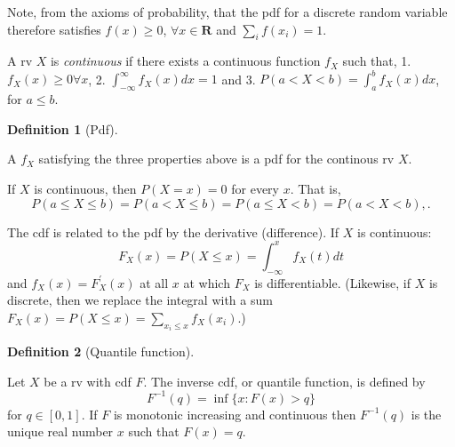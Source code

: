 \documentclass[
  a4paper,
  oneside]{book}
\theoremstyle{definition}
\newtheorem{definition}{Definition}[chapter]
\theoremstyle{definition}
\theoremstyle{definition}
\theoremstyle{plain}
\theoremstyle{remark}
\begin{document}
Note, from the axioms of probability, that the pdf for a discrete random
variable therefore satisfies \(f(x) \geq 0\),
\(\forall x \in \mathbf{R}\) and \(\sum_i f(x_i) = 1\).

A rv \(X\) is \emph{continuous} if there exists a continuous function
\(f_X\) such that, 1. \(f_X(x) \geq 0 \forall x\), 2.
\(\int_{-\infty}^\infty f_X(x) dx = 1\) and 3.
\(P(a < X < b) = \int_a^b f_X(x) dx\), for \(a\leq b\).

\begin{definition}[Pdf]\protect\hypertarget{def-pdf}{}\label{def-pdf}

A \(f_X\) satisfying the three properties above is a pdf for the
continous rv \(X\).

\end{definition}

\begin{tcolorbox}[enhanced jigsaw, colframe=quarto-callout-warning-color-frame, breakable, toprule=.15mm, bottomrule=.15mm, title=\textcolor{quarto-callout-warning-color}{\faExclamationTriangle}\hspace{0.5em}{Warning}, arc=.35mm, opacityback=0, left=2mm, opacitybacktitle=0.6, bottomtitle=1mm, toptitle=1mm, titlerule=0mm, rightrule=.15mm, colback=white, colbacktitle=quarto-callout-warning-color!10!white, coltitle=black, leftrule=.75mm]

If \(X\) is continuous, then \(P(X = x) = 0\) for every \(x\). That is,
\[ 
P(a \leq X \leq b) = P(a < X \leq b) = P(a \leq X < b) = P(a < X < b),.
\]

\end{tcolorbox}

The cdf is related to the pdf by the derivative (difference). If \(X\)
is continuous: \[ F_X(x) = P(X \leq x) = \int_{-\infty}^x f_X(t) dt\]
and \(f_X(x) = F_X^\prime(x)\) at all \(x\) at which \(F_X\) is
differentiable. (Likewise, if \(X\) is discrete, then we replace the
integral with a sum
\(F_X(x) = P(X \leq x) = \sum_{x_i \leq x} f_X(x_i)\).)

\begin{definition}[Quantile
function]\protect\hypertarget{def-quantile}{}\label{def-quantile}

Let \(X\) be a rv with cdf \(F\). The inverse cdf, or quantile function,
is defined by \[F^{-1}(q) = \inf \{x : F(x) > q\}\] for \(q \in [0,1]\).
If \(F\) is monotonic increasing and continuous then \(F^{-1}(q)\) is
the unique real number \(x\) such that \(F(x) = q\).

\end{definition}
\end{document}
